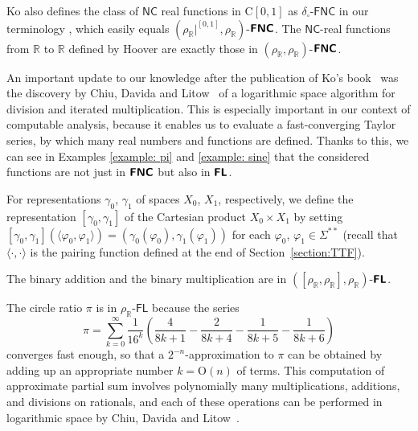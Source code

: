 \documentclass[envcountsect,envcountsame,orivec,oribibl]{llncs}
\newcommand{\R}{\mathbb R}
\newcommand{\classonefont}[1]{\mathsf{#1}}
\newcommand{\classFL}{\classonefont{FL}}
\newcommand{\classNC}{\classonefont{NC}}
\newcommand{\classFNC}{\classonefont{FNC}}
\newcommand{\classtwofont}[1]{\text{\bfseries \sffamily \upshape #1}}
\newcommand{\classFLtwo}{\classtwofont{FL}}
\newcommand{\classFNCtwo}{\classtwofont{FNC}}
\newcommand{\deltabox}{\delta _\square}
\newcommand{\rhoR}{\rho _\R}
\newcommand{\rhoRunit}{\rho _\R|^{[0,1]}}
\newcommand{\classC}{\mathrm C}
\newcommand{\LM}{\varSigma ^{**}}
\begin{document}
Ko also defines the class of $\classNC$ real functions in $\classC[0,1]$
as $\deltabox$-$\classFNC$ in our terminology 
\cite{ko1991complexity},
which easily equals $(\rhoRunit, \rhoR)$-$\classFNCtwo$.
The $\classNC$-real functions from $\R$ to $\R$ defined by Hoover \cite{hoover1991real}
are exactly those in $(\rhoR, \rhoR)$-$\classFNCtwo$.

An important update to our knowledge
after the publication of Ko's book~\cite{ko1991complexity} was the 
discovery by Chiu, Davida and Litow~\cite{chiu2001division}
of a logarithmic space algorithm 
for division and iterated multiplication. 
This is especially important in our context of computable analysis, 
because it enables us to evaluate a fast-converging Taylor series, 
by which many real numbers and functions are defined. 
Thanks to this, we can see 
in Examples \ref{example: pi} and \ref{example: sine}
that the considered functions are not just in $\classFNCtwo$ but also in $\classFLtwo$. 

For representations $\gamma _0$, $\gamma _1$ of 
spaces $X _0$, $X _1$, respectively, 
we define the representation $[\gamma _0, \gamma _1]$
of the Cartesian product $X _0 \times X _1$ by 
setting $
  [\gamma _0, \gamma _1] (\langle \varphi _0, \varphi _1 \rangle) 
= 
  (\gamma _0 (\varphi _0), \gamma _1 (\varphi _1))
$ for each $\varphi _0$, $\varphi _1 \in \LM$
(recall that $\langle \mathord\cdot, \mathord\cdot \rangle$
is the pairing function defined at the end of Section~\ref{section:TTF}). 

\begin{example}
 The binary addition and the binary multiplication are
 in $([\rhoR, \rhoR], \rhoR)$-$\classFLtwo$.
\end{example}

\begin{example}
\label{example: pi}
The circle ratio $\pi$ is in $\rhoR$-$\classFL$ because the series
\begin{equation}
 \pi = \sum_{k=0}^\infty \frac{1}{16^k} 
  \left( \frac{4}{8k+1} - \frac{2}{8k+4} - \frac{1}{8k+5} - \frac{1}{8k+6} \right)
\end{equation}
converges fast enough, 
so that a $2 ^{-n}$-approximation to $\pi$ can be obtained by adding up 
an appropriate number $k = \mathrm O (n)$ of terms. 
This computation of approximate partial sum involves 
polynomially many multiplications, additions, and divisions on rationals, 
and each of these operations can be performed in logarithmic space
by Chiu, Davida and Litow~\cite{chiu2001division}.
\end{example}
\end{document}
